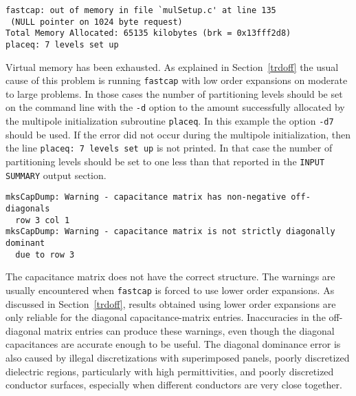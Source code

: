 \begin{verbatim}
fastcap: out of memory in file `mulSetup.c' at line 135
 (NULL pointer on 1024 byte request)
Total Memory Allocated: 65135 kilobytes (brk = 0x13fff2d8)
placeq: 7 levels set up
\end{verbatim}\vspace{-\topsep}
Virtual memory has been exhausted. As explained in Section~\ref{trdoff}
the usual cause of this problem is running {\tt fastcap} with low order
expansions on moderate to large problems. In those cases the number of
partitioning levels should be set on the command line with the
{\tt -d} option to the amount successfully allocated by 
the multipole initialization subroutine {\tt placeq}. In
this example the option {\tt -d7} should be used. 
If the error
did not occur during the multipole initialization, then the 
line \verb~placeq: 7 levels set up~ is not printed. In that case the
number of partitioning levels should be set to one less than that
reported in the \verb~INPUT SUMMARY~ output section.

\begin{verbatim}
mksCapDump: Warning - capacitance matrix has non-negative off-diagonals
  row 3 col 1
mksCapDump: Warning - capacitance matrix is not strictly diagonally dominant
  due to row 3
\end{verbatim}\vspace{-\topsep}
The capacitance matrix does not have the correct structure. The 
warnings are usually encountered when {\tt fastcap} is forced to use lower
order expansions. As discussed in Section~\ref{trdoff}, 
results obtained using lower order 
expansions are only reliable for the diagonal capacitance-matrix entries.
Inaccuracies in the off-diagonal matrix entries can produce these warnings,
even though the diagonal capacitances are accurate enough to be useful.
The diagonal dominance  error is also caused by
illegal discretizations with superimposed
panels, poorly discretized dielectric regions, particularly with
high permittivities, and poorly discretized conductor surfaces, especially
when different conductors are very close together.



